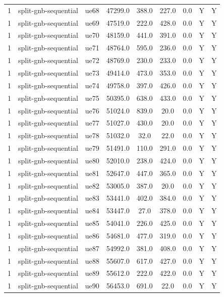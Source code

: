 \begin{table}[ht]
\begin{tabular}{|c|c|c|c|c|c|c|c|c|}
1 & split-gnb-sequential & ue68 & 47299.0 & 388.0 & 227.0 & 0.0 & Y & Y \\
1 & split-gnb-sequential & ue69 & 47519.0 & 222.0 & 428.0 & 0.0 & Y & Y \\
1 & split-gnb-sequential & ue70 & 48159.0 & 441.0 & 391.0 & 0.0 & Y & Y \\
1 & split-gnb-sequential & ue71 & 48764.0 & 595.0 & 236.0 & 0.0 & Y & Y \\
1 & split-gnb-sequential & ue72 & 48769.0 & 230.0 & 233.0 & 0.0 & Y & Y \\
1 & split-gnb-sequential & ue73 & 49414.0 & 473.0 & 353.0 & 0.0 & Y & Y \\
1 & split-gnb-sequential & ue74 & 49758.0 & 397.0 & 426.0 & 0.0 & Y & Y \\
1 & split-gnb-sequential & ue75 & 50395.0 & 638.0 & 433.0 & 0.0 & Y & Y \\
1 & split-gnb-sequential & ue76 & 51024.0 & 839.0 & 20.0 & 0.0 & Y & Y \\
1 & split-gnb-sequential & ue77 & 51027.0 & 430.0 & 20.0 & 0.0 & Y & Y \\
1 & split-gnb-sequential & ue78 & 51032.0 & 32.0 & 22.0 & 0.0 & Y & Y \\
1 & split-gnb-sequential & ue79 & 51491.0 & 110.0 & 291.0 & 0.0 & Y & Y \\
1 & split-gnb-sequential & ue80 & 52010.0 & 238.0 & 424.0 & 0.0 & Y & Y \\
1 & split-gnb-sequential & ue81 & 52647.0 & 447.0 & 365.0 & 0.0 & Y & Y \\
1 & split-gnb-sequential & ue82 & 53005.0 & 387.0 & 20.0 & 0.0 & Y & Y \\
1 & split-gnb-sequential & ue83 & 53441.0 & 402.0 & 384.0 & 0.0 & Y & Y \\
1 & split-gnb-sequential & ue84 & 53447.0 & 27.0 & 378.0 & 0.0 & Y & Y \\
1 & split-gnb-sequential & ue85 & 54041.0 & 226.0 & 425.0 & 0.0 & Y & Y \\
1 & split-gnb-sequential & ue86 & 54681.0 & 477.0 & 319.0 & 0.0 & Y & Y \\
1 & split-gnb-sequential & ue87 & 54992.0 & 381.0 & 408.0 & 0.0 & Y & Y \\
1 & split-gnb-sequential & ue88 & 55607.0 & 617.0 & 427.0 & 0.0 & Y & Y \\
1 & split-gnb-sequential & ue89 & 55612.0 & 222.0 & 422.0 & 0.0 & Y & Y \\
1 & split-gnb-sequential & ue90 & 56453.0 & 691.0 & 22.0 & 0.0 & Y & Y \\

\end{tabular}
\end{table}
